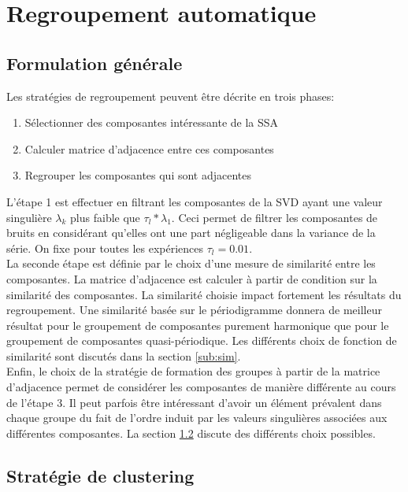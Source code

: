 \documentclass{gretsi}
\begin{document}

\section{Regroupement automatique}

\subsection{Formulation générale}
\label{sub:form}

Les stratégies de regroupement  peuvent être décrite en trois phases:
\begin{enumerate}
	\item Sélectionner des composantes intéressante de la SSA
	\item Calculer matrice d'adjacence entre ces composantes
	\item Regrouper les composantes qui sont adjacentes
\end{enumerate}
L'étape 1 est effectuer en filtrant les composantes de la SVD ayant une valeur singulière $\lambda_k$ plus faible que $\tau_l*\lambda_1$. Ceci permet de filtrer les composantes de bruits en considérant qu'elles ont une part négligeable dans la variance de la série. On fixe pour toutes les expériences $\tau_l = 0.01$.\\

La seconde étape est définie par le choix d'une mesure de similarité entre les composantes. La matrice d'adjacence est calculer à partir de condition sur la similarité des composantes. La similarité choisie impact fortement les résultats du regroupement. Une similarité basée sur le périodigramme donnera de meilleur résultat pour le groupement de composantes purement harmonique que pour le groupement de composantes quasi-périodique. Les différents choix de fonction de similarité sont discutés dans la section \ref{sub:sim}.\\

Enfin, le choix de la stratégie de formation des groupes à partir de la matrice d'adjacence permet de considérer les composantes de manière différente au cours de l'étape 3. Il peut parfois être intéressant d'avoir un élément prévalent dans chaque groupe du fait de l'ordre induit par les valeurs singulières associées aux différentes composantes. La section \ref{sub:clust} discute des différents choix possibles.



\subsection{Stratégie de clustering}
\label{sub:clust}
\end{document}
